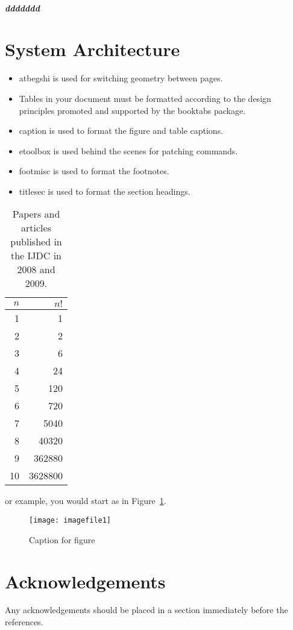 \documentclass[practice]{ijdc-v9}
\begin{document}
\subparagraph{ddddddd}

\section{System Architecture}

\begin{itemize}
\item\textsf{atbegshi} is used for switching geometry between pages.
\item Tables in your document must be formatted according to the design principles promoted and supported by the \textsf{booktabs} package.
\item\textsf{caption} is used to format the figure and table captions.
\item\textsf{etoolbox} is used behind the scenes for patching commands.
\item\textsf{footmisc} is used to format the footnotes.
\item\textsf{titlesec} is used to format the section headings.
\end{itemize}



\begin{table}
\caption{Papers and articles published in the IJDC in 2008 and 2009.} 
\label{tab:issues} 
\centering\small 
\begin{tabular}{|r|r|}
\hline
$n$&$n!$\\
\hline
1&1\\
2&2\\
3&6\\
4&24\\
5&120\\
6&720\\
7&5040\\
8&40320\\
9&362880\\
10&3628800\\
\hline
\end{tabular}\end{table}


or example, you would start as in Figure~\ref{fig:start-paper}.

\begin{figure}
    \centering
    \texttt{[image: imagefile1]}
    \caption{Caption for figure}
    \label{fig:start-paper}
\end{figure}


\section{Acknowledgements}

Any acknowledgements should be placed in a section immediately before the references.\nocite{*}


\end{document}
